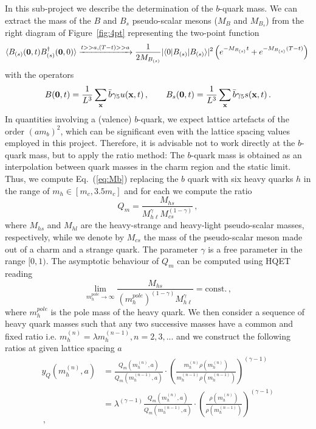 In this sub-project we describe the determination of the $b$-quark
mass. We can extract the mass of the $B$ and $B_s$ pseudo-scalar mesons ($M_{B}$ and $M_{B_s}$)
from the right diagram of Figure~\ref{fig:4pt} representing the two-point function
\begin{equation}
  \langle B_{(s)}(\bm{0},t) B_{(s)}^\dagger({\bf 0},0)\rangle\xrightarrow{t>>a, (T-t)>>a}
  \frac{1}{2M_{B_{(s)}}}|\langle 0 | B_{(s)} | B_{(s)}\rangle|^2\left(e^{-M_{B_{(s)}} t}+e^{-M_{B_{(s)}}(T-t)}\right)
  \,
  \label{eq:Mb}
\end{equation}
with the operators
\[
B({\bf 0},t)=\frac{1}{L^3}\sum_{\bf x}\bar b\gamma_5 u({\bf x},t)\,,\qquad
B_s({\bf 0},t)=\frac{1}{L^3}\sum_{\bf x}\bar b\gamma_5 s({\bf x},t)\,.
\]
In quantities involving a (valence) $b$-quark, we expect lattice
artefacts of the order $(am_b)^2$, which can be significant even with
the lattice spacing values employed in this project. Therefore, it is
advisable not to work directly at the $b$-quark mass, but to apply the
ratio method: The $b$-quark mass is obtained as an interpolation
between quark masses in the charm region and the static limit.
Thus, we compute Eq.~(\ref{eq:Mb}) replacing the $b$ quark with six heavy quarks $h$
in the range of $m_h\in [m_c,3.5m_c]$
and for each we compute the ratio
\begin{equation}
  Q_m = \frac{M_{hs}}{M_{h\ell}^\gamma M_{cs}^{(1-\gamma)}}\,,
  \label{eq:ratio_Q}
\end{equation}
where $M_{hs}$ and $M_{hl}$ are the heavy-strange and heavy-light
pseudo-scalar masses, respectively, while we denote by $M_{cs}$
the mass of the pseudo-scalar meson made out of a charm
and a strange quark. The parameter $\gamma$ is a free parameter in the range $[0, 1)$.
The asymptotic behaviour of $Q_m$ can be computed using HQET reading
\begin{equation}
  \lim_{ m^{pole}_h\to \infty}
  \frac{M_{hs}}{( m^{pole}_h)^{(1-\gamma)} M_{h\ell}^\gamma}=\mbox{const.}\,,
  \label{eq:yHQFTlim}
\end{equation}
where $ m^{pole}_h$ is the pole mass of the heavy quark.
We then consider a sequence of heavy quark masses such that any two
successive masses have a common and fixed ratio i.e.
$ m_h^{(n)}=\lambda m_h^{(n-1)}, n=2,3,...$ and we construct the
following ratios at given lattice spacing $a$
\begin{equation}
  \begin{split}
    y_Q( m^{(n)}_h,a)&=\frac{Q_m( m_h^{(n)},a)}{Q_m( m_h^{(n-1)},a)}\cdot
    \left(\frac{ m_{h}^{(n)} \rho( m_{h}^{(n)})}{ m_{h}^{(n-1)}\rho( m_{h}^{(n-1)})}\right)^{(\gamma-1)}\\
    &=\lambda^{(\gamma-1)}\frac{Q_m( m_h^{(n)},a)}{Q_m( m_h^{(n-1)},a)}\cdot
    \left(\frac{ \rho( m_{h}^{(n)})}{\rho(
      m_{h}^{(n-1)})}\right)^{(\gamma-1)}\\\,,
  \end{split}
\end{equation}
